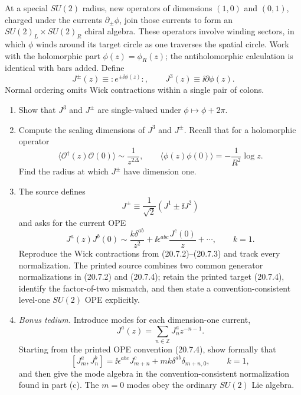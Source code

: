 \begin{enumerate}
  At a special \(SU(2)\) radius, new operators of dimensions \((1,0)\)
  and \((0,1)\), charged under the currents \(\partial_\pm\phi\), join
  those currents to form an \(SU(2)_L\times SU(2)_R\) chiral algebra.
  These operators involve winding sectors, in which \(\phi\) winds around
  its target circle as one traverses the spatial circle.  Work with the
  holomorphic part \(\phi(z)=\phi_R(z)\); the antiholomorphic calculation
  is identical with bars added.  Define
  \[
    J^\pm(z)\equiv:\!e^{\pm \ii\phi(z)}\!:,
    \qquad
    J^3(z)\equiv \ii\partial\phi(z).
    \tag{20.7.2}
  \]
  Normal ordering omits Wick contractions within a single pair of
  colons.
  \begin{enumerate}
    \item[(a)]
    Show that \(J^3\) and \(J^\pm\) are single-valued under
    \(\phi\mapsto\phi+2\pi\).

    \item[(b)]
    Compute the scaling dimensions of \(J^3\) and \(J^\pm\).  Recall that
    for a holomorphic operator
    \[
      \langle\mathcal O^\dagger(z)\mathcal O(0)\rangle
        \sim\frac{1}{z^{2\Delta}},
      \qquad
      \langle\phi(z)\phi(0)\rangle=-\frac{1}{R^2}\log z .
      \tag{20.7.3}
    \]
    Find the radius at which \(J^\pm\) have dimension one.

    \item[(c)]
    The source defines
    \[
      J^\pm\equiv\frac{1}{\sqrt2}(J^1\pm \ii J^2)
    \]
    and asks for the current OPE
    \[
      J^a(z)J^b(0)\sim
        \frac{k\delta^{ab}}{z^2}
        +\ii\epsilon^{abc}\frac{J^c(0)}{z}+\cdots ,
      \qquad k=1.
      \tag{20.7.4}
    \]
    Reproduce the Wick contractions from (20.7.2)--(20.7.3) and track
    every normalization.  The printed source combines two common
    generator normalizations in (20.7.2) and (20.7.4); retain the printed
    target (20.7.4), identify the factor-of-two mismatch, and then state a
    convention-consistent level-one \(SU(2)\) OPE explicitly.

    \item[(d)]
    \emph{Bonus tedium.}  Introduce modes for each dimension-one current,
    \[
      J^a(z)=\sum_{n\in\mathbb Z}J_n^a z^{-n-1}.
    \]
    Starting from the printed OPE convention (20.7.4), show formally that
    \[
      [J_m^a,J_n^b]
        =\ii\epsilon^{abc}J_{m+n}^c
          +mk\delta^{ab}\delta_{m+n,0},
      \qquad k=1,
      \tag{20.7.5}
    \]
    and then give the mode algebra in the convention-consistent
    normalization found in part (c).  The \(m=0\) modes obey the ordinary
    \(SU(2)\) Lie algebra.


\end{enumerate}
\end{enumerate}
